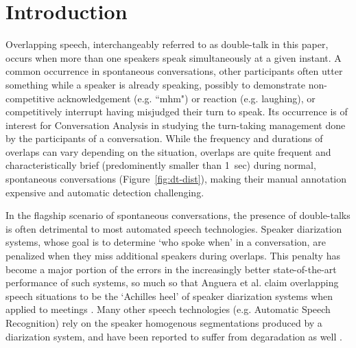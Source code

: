 \documentclass[a4paper]{article}
\begin{document}
\section{Introduction}

Overlapping speech, interchangeably referred to as double-talk in this paper,
occurs when more than one speakers speak simultaneously at a given instant.
A common occurrence in spontaneous conversations,
other participants often utter something while a speaker is already speaking,
possibly to demonstrate non-competitive acknowledgement (e.g. “mhm") or reaction (e.g. laughing),
or competitively interrupt having misjudged their turn to speak.
Its occurrence is of interest for Conversation Analysis in studying the
turn-taking management done by the participants of a conversation.
While the frequency and durations of overlaps can vary depending on the situation,
overlaps are quite frequent and characteristically brief (predominently smaller than 1~sec)
during normal, spontaneous conversations (Figure~\ref{fig:dt-dist}),
making their manual annotation expensive and automatic detection challenging.

In the flagship scenario of spontaneous conversations,
the presence of double-talks is often detrimental to most automated speech technologies.
Speaker diarization systems, whose goal is to determine `who spoke when' in a conversation,
are penalized when they miss additional speakers during overlaps.
This penalty has become a major portion of the errors in the increasingly better
state-of-the-art performance of such systems,
so much so that Anguera et al. claim overlapping speech situations to be the `Achilles heel' of
speaker diarization systems when applied to meetings \cite{anguera_speaker_2012}.
Many other speech technologies (e.g. Automatic Speech Recognition)
rely on the speaker homogenous segmentations produced by a diarization system,
and have been reported to suffer from degaradation as well \cite{cetin_speaker_2006,RenalsDistantspeechrecognition2017}.
\end{document}
